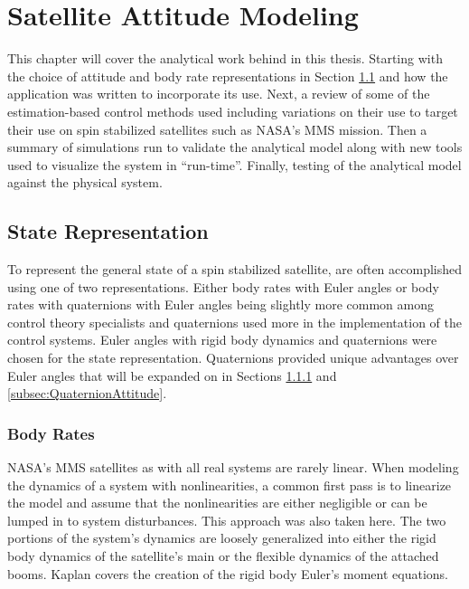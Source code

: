 
\chapter{Satellite Attitude Modeling}
\label{chap:SatelliteAttitudeModeling}

This chapter will cover the analytical work behind in this thesis.  Starting with the choice of attitude and body rate representations in Section \ref{sec:StateRepresentation} and how the application was written to incorporate its use.  Next, a review of some of the estimation-based control methods used including variations on their use to target their use on spin stabilized satellites such as NASA's MMS mission.  Then a summary of simulations run to validate the analytical model along with new tools used to visualize the system in ``run-time''.  Finally, testing of the analytical model against the physical system.

\section{State Representation}
\label{sec:StateRepresentation}

To represent the general state of a spin stabilized satellite, are often accomplished using one of two representations.  Either body rates with Euler angles or body rates with quaternions with Euler angles being slightly more common among control theory specialists and quaternions used more in the implementation of the control systems.  Euler angles with rigid body dynamics and quaternions were chosen for the state representation.  Quaternions provided unique advantages over Euler angles that will be expanded on in Sections \ref{subsec:BodyRate} and \ref{subsec:QuaternionAttitude}.

\subsection{Body Rates}
\label{subsec:BodyRate}

NASA's MMS satellites as with all real systems are rarely linear.  When modeling the dynamics of a system with nonlinearities, a common first pass is to linearize the model and assume that the nonlinearities are either negligible or can be lumped in to system disturbances.  This approach was also taken here.  The two portions of the system's dynamics are loosely generalized into either the rigid body dynamics of the satellite's main or the flexible dynamics of the attached booms.  Kaplan \cite{kaplan} covers the creation of the rigid body Euler's moment equations.

